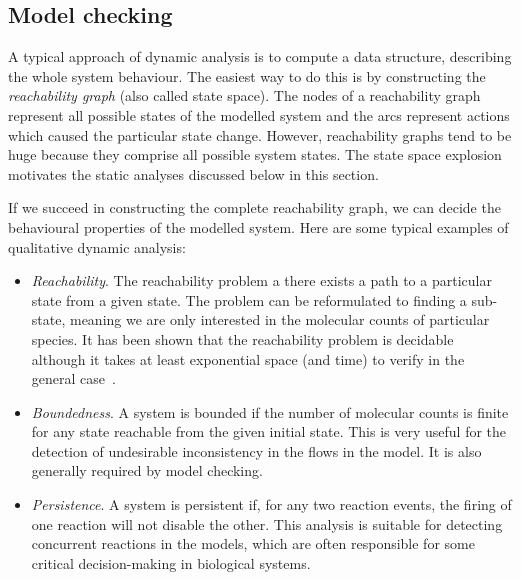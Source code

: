 \documentclass[11pt,a4paper]{report}
\begin{document}
\subsection{Model checking}

A typical approach of dynamic analysis is to compute a data structure, describing the whole system behaviour. The easiest way to do this is by constructing the \emph{reachability graph} (also called state space). The nodes of a reachability graph represent all possible states of the modelled system and the arcs represent actions which caused the particular state change. However, reachability graphs tend to be huge because they comprise all possible system states. The state space explosion motivates the static analyses discussed below in this section. 

If we succeed in constructing the complete reachability graph, we can decide the behavioural properties of the modelled system. Here are some typical examples of qualitative dynamic analysis:

\begin{itemize}
	\item \emph{Reachability}. The reachability problem a there exists a path to a particular state from a given state. The problem can be reformulated to finding a sub-state, meaning we are only interested in the molecular counts of particular species. It has been shown that the reachability problem is decidable~\cite{kosaraju1982decidability} although it takes at least exponential space (and time) to verify in the general case~\cite{lipton1976reachability}.
	\item \emph{Boundedness}. A system is bounded if the number of molecular counts is finite for any state reachable from the given initial state. This is very useful for the detection of undesirable inconsistency in the flows in the model. It is also generally required by model checking.
	\item \emph{Persistence}. A system is persistent if, for any two reaction events, the firing of one reaction will not disable the other. This analysis is suitable for detecting concurrent reactions in the models, which are often responsible for some critical decision-making in biological systems.
\end{itemize}
\end{document}
